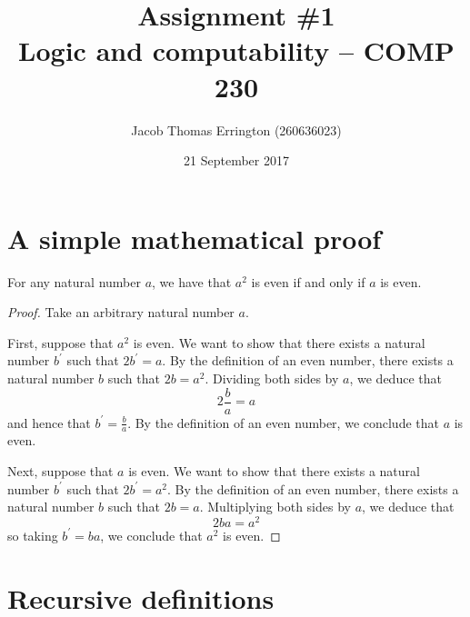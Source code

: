 \documentclass[11pt,letterpaper]{article}
\author{Jacob Thomas Errington (260636023)}
\title{Assignment \#1\\Logic and computability -- COMP 230}
\date{21 September 2017}
\begin{document}
\maketitle

\section{A simple mathematical proof}

\begin{prop}
    For any natural number $a$, we have that $a^2$ is even if and only if $a$
    is even.
\end{prop}

\begin{proof}
    Take an arbitrary natural number $a$.

    First, suppose that $a^2$ is even.
    We want to show that there exists a natural number $b^\prime$ such that
    $2b^\prime = a$.
    By the definition of an even number, there exists a natural number $b$ such
    that $2b = a^2$. Dividing both sides by $a$, we deduce that
    \begin{equation*}
        2 \frac{b}{a} = a
    \end{equation*}
    and hence that $b^\prime = \frac{b}{a}$.
    By the definition of an even number, we conclude that $a$ is even.

    Next, suppose that $a$ is even.
    We want to show that there exists a natural number $b^\prime$ such that
    $2b^\prime = a^2$.
    By the definition of an even number, there exists a natural number $b$ such
    that $2b = a$.
    Multiplying both sides by $a$, we deduce that
    \begin{equation*}
        2 b a = a^2
    \end{equation*}
    so taking $b^\prime = b a$, we conclude that $a^2$ is even.
\end{proof}

\section{Recursive definitions}
\end{document}
